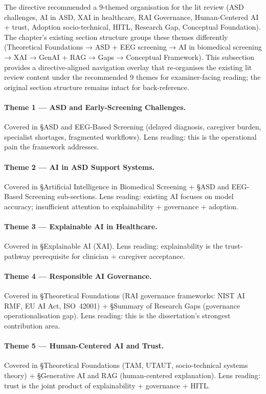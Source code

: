 The directive recommended a 9-themed organisation for the lit review (ASD challenges, AI in ASD, XAI in healthcare, RAI Governance, Human-Centered AI + trust, Adoption socio-technical, HITL, Research Gap, Conceptual Foundation). The chapter's existing section structure groups these themes differently (Theoretical Foundations → ASD + EEG screening → AI in biomedical screening → XAI → GenAI + RAG → Gaps → Conceptual Framework). This subsection provides a directive-aligned navigation overlay that re-organises the existing lit review content under the recommended 9 themes for examiner-facing reading; the original section structure remains intact for back-reference.

\paragraph{Theme 1 --- ASD and Early-Screening Challenges.} Covered in §ASD and EEG-Based Screening (delayed diagnosis, caregiver burden, specialist shortages, fragmented workflows). Lens reading: this is the operational pain the framework addresses.

\paragraph{Theme 2 --- AI in ASD Support Systems.} Covered in §Artificial Intelligence in Biomedical Screening + §ASD and EEG-Based Screening sub-sections. Lens reading: existing AI focuses on model accuracy; insufficient attention to explainability + governance + adoption.

\paragraph{Theme 3 --- Explainable AI in Healthcare.} Covered in §Explainable AI (XAI). Lens reading: explainability is the trust-pathway prerequisite for clinician + caregiver acceptance.

\paragraph{Theme 4 --- Responsible AI Governance.} Covered in §Theoretical Foundations (RAI governance frameworks: NIST AI RMF, EU AI Act, ISO~42001) + §Summary of Research Gaps (governance operationalisation gap). Lens reading: this is the dissertation's strongest contribution area.

\paragraph{Theme 5 --- Human-Centered AI and Trust.} Covered in §Theoretical Foundations (TAM, UTAUT, socio-technical systems theory) + §Generative AI and RAG (human-centered explanation). Lens reading: trust is the joint product of explainability + governance + HITL.

